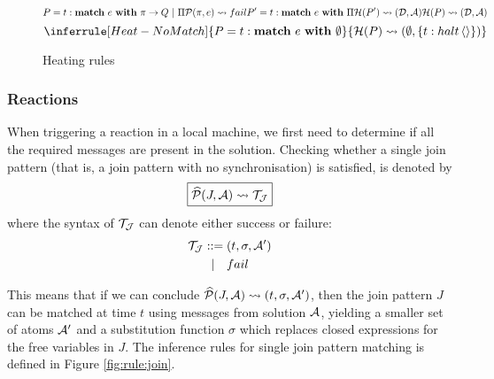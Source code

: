 \begin{figure}[!h]
{\begin{minipage}{0.97\textwidth}
\begin{equation*}
{P = t:\mathbf{match}~e~\mathbf{with}~\pi \rightarrow Q~|~\Pi
\\ \mathcal{P}(\pi,e) \leadsto fail
\\ P' = t:\mathbf{match}~e~\mathbf{with}~\Pi
\\ \mathcal{H}(P') \leadsto (\mathcal{D}, \mathcal{A})
}
{\mathcal{H}(P) \leadsto (\mathcal{D},\mathcal{A})}
\end{equation*}
\begin{equation*}
\inferrule[Heat-NoMatch]
{P = t:\mathbf{match}~e~\mathbf{with}~\emptyset}
{\H(P) \leadsto (\emptyset, \{ \atm t:halt<> \}) }
\end{equation*}
\end{minipage}}
\caption{Heating rules}\label{fig:rule:heat}
\end{figure}


\subsubsection{Reactions}

When triggering a reaction in a local machine, we first need to determine if
all the required messages are present in the solution. Checking whether a
single join pattern (that is, a join pattern with no synchronisation) is
satisfied, is denoted by
\begin{equation*}
 \boxed{\widehat{\mathcal{P}}(J,\mathcal{A}) \leadsto \mathcal{T}_{\mathcal{J}}}
\end{equation*}
where the syntax of $\mathcal{T}_{\mathcal{J}}$ can denote either success or failure:
\begin{align*}
 \mathcal{T}_{\mathcal{J}} ::= {}& (t, \sigma, \mathcal{A}') \\
       |\quad& fail
\end{align*}

This means that if we can conclude $\widehat{\mathcal{P}}(J, \mathcal{A}) \leadsto (t,\sigma,\mathcal{A}')$,
then the join pattern $J$ can be matched at time $t$ using messages from
solution $\mathcal{A}$, yielding a smaller set of atoms $\mathcal{A}'$ and a substitution
function $\sigma$ which replaces closed expressions for the free variables in
$J$. The inference rules for single join pattern matching is defined in Figure
\ref{fig:rule:join}.

